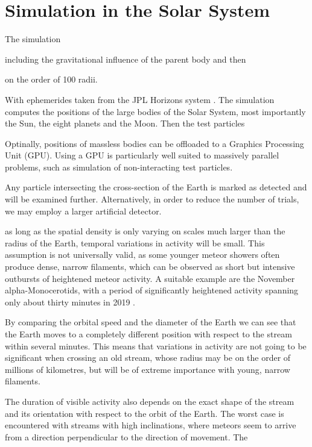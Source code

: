 \section{Simulation in the Solar System} \label{as}
    The simulation 

    including the gravitational influence of the parent body and then

    on the order of 100 radii.

    With ephemerides taken from the JPL Horizons system \citep{...}.
    The simulation computes the positions of the large bodies of the Solar System, most importantly the Sun,
    the eight planets and the Moon. Then the test particles

    Optinally, positions of massless bodies can be offloaded to a Graphics Processing Unit (GPU).
    Using a GPU is particularly well suited to massively parallel problems, such as simulation of non-interacting test particles.

    Any particle intersecting the cross-section of the Earth is marked as detected and will be examined further.
    Alternatively, in order to reduce the number of trials, we may employ a larger artificial detector.


    as long as the spatial density is only varying on scales much larger than the radius of the Earth,
    temporal variations in activity will be small.
    This assumption is not universally valid, as some younger meteor showers often produce dense, narrow filaments,
    which can be observed as short but intensive outbursts of heightened meteor activity.
    A suitable example are the November alpha-Monocerotids, with a period of significantly
    heightened activity spanning only about thirty minutes in 2019 \citep{CBET4692}.

    By comparing the orbital speed and the diameter of the Earth we can see that the Earth moves
    to a completely different position with respect to the stream within several minutes.
    This means that variations in activity are not going to be significant when crossing an old stream,
    whose radius may be on the order of millions of kilometres, but will be of extreme importance with young, narrow filaments.

    The duration of visible activity also depends on the exact shape of the stream and its orientation with respect to the orbit of the Earth.
    The worst case is encountered with streams with high inclinations, where meteors seem to arrive from a direction perpendicular
    to the direction of movement. The 
    
